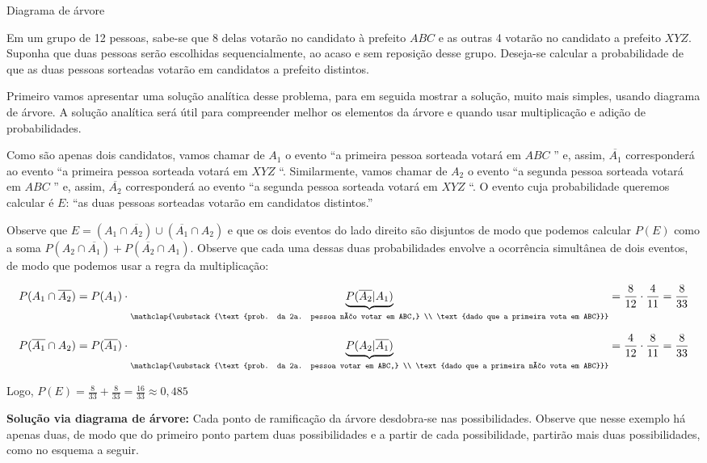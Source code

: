\begin{example} {Diagrama de árvore}

Em um grupo de 12 pessoas, sabe-se que 8 delas votarão no candidato à prefeito  \(ABC\) e as outras 4 votarão no candidato a prefeito \(XYZ\). Suponha que duas pessoas serão escolhidas sequencialmente, ao acaso e sem reposição desse grupo. Deseja-se calcular a probabilidade de que as duas pessoas sorteadas votarão em candidatos a prefeito distintos.

Primeiro vamos apresentar uma solução analítica desse problema, para em seguida mostrar a solução, muito mais simples, usando diagrama de árvore. A solução analítica será útil para compreender melhor os elementos da árvore e quando usar multiplicação e adição de probabilidades.

Como são apenas dois candidatos, vamos chamar de \(A_1\) o evento “a primeira pessoa sorteada votará em \(ABC\) ” e, assim, \(\overline{A_1}\) corresponderá ao evento “a primeira pessoa sorteada votará em \(XYZ\) “. Similarmente, vamos chamar de \(A_2\) o evento “a segunda pessoa sorteada votará em \(ABC\) ” e, assim, \(\overline{A_2}\) corresponderá ao evento “a segunda pessoa sorteada votará em \(XYZ\) “. O evento cuja probabilidade queremos calcular é \(E\): “as duas pessoas sorteadas votarão em candidatos distintos.”

Observe que \(E=(A_1\cap \overline{A_2})\cup (\overline{A_1}\cap A_2)\)  e que os dois eventos do lado direito são disjuntos de modo que podemos calcular \(P(E)\) como a soma \(P(A_2\cap \overline{A_1})+P(\overline{A_2}\cap A_1)\). Observe que cada uma dessas duas probabilidades envolve a ocorrência simultânea de dois eventos, de modo que podemos usar a regra da multiplicação:

$$P(A_1\cap \overline{A_2})=P({A_1})\cdot \underbrace{P(\overline{A_2}|{A_1})}_{\mathclap{\substack{\text{prob. da 2a. pessoa não votar em ABC,} \\ \text{dado que a primeira vota em ABC}}}}=\frac{8}{12}\cdot\frac{4}{11}=\frac{8}{33}$$

$$P(\overline{A_1}\cap {A_2})=P(\overline{A_1})\cdot \underbrace{P({A_2}|\overline{A_1})}_{\mathclap{\substack{\text{prob. da 2a. pessoa votar em ABC,} \\ \text{dado que a primeira não vota em ABC}}}}=\frac{4}{12}\cdot\frac{8}{11}=\frac{8}{33}$$

Logo, \(\displaystyle{P(E)=\frac{8}{33}+\frac{8}{33}=\frac{16}{33}\approx 0,485}\)

\textbf{Solução via diagrama de árvore:} Cada ponto de ramificação da árvore desdobra-se nas possibilidades. Observe que nesse exemplo há apenas duas, de modo que do primeiro ponto partem duas possibilidades e a partir de cada possibilidade, partirão mais duas possibilidades, como no esquema a seguir.
\begin{figure}[H]
\centering


\end{figure}
\end{example}
